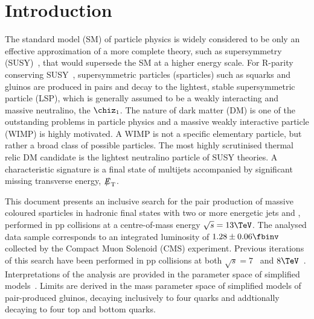 \section{Introduction}
\label{sec:introduction}

The standard model (SM) of particle physics is widely considered to be
only an effective approximation of a more complete theory, such as
supersymmetry (SUSY)~\cite{ref:SUSY-1,ref:SUSY0,ref:SUSY1,ref:SUSY2,ref:SUSY3,ref:SUSY4,ref:hierarchy1,ref:hierarchy2},
that would supersede the SM at a higher energy scale. For R-parity conserving
SUSY~\cite{Farrar:1978xj}, supersymmetric particles (sparticles) such
as squarks and gluinos are produced in pairs and decay to the
lightest, stable supersymmetric particle (LSP), which is generally
assumed to be a weakly interacting and massive neutralino, the $\chiz_1$. 
The nature of dark matter (DM) is one of the outstanding problems in particle physics and a massive weakly interactive particle (WIMP) is highly motivated. A WIMP is not a specific elementary particle, but rather a broad class of possible particles. The most highly scrutinised thermal relic DM candidate is the lightest neutralino particle of SUSY theories.
A characteristic signature is a final state of multijets accompanied by
significant missing transverse energy, $\met$.

This document presents an inclusive search for the pair production of
massive coloured sparticles in hadronic final states with two or more
energetic jets and \met, performed in pp collisions at a
centre-of-mass energy $\sqrt{s} = 13\TeV$. The analysed data sample
corresponds to an integrated luminosity of $1.28 \pm 0.06 \fbinv$~\cite{lumi} collected by the Compact Muon Solenoid (CMS)
experiment. Previous iterations of this search have been performed in
pp collisions at both $\sqrt{s} = 7$~\cite{RA1Paper, RA1Paper2011,
  RA1Paper2011FULL} and $8\TeV$~\cite{RA1Paper2012}.
%
%
Interpretations of the analysis are provided in the parameter space of simplified models~\cite{Alwall:2008ag, Alwall:2008va, sms}. Limits are derived in the mass parameter space of simplified models of pair-produced gluinos, decaying inclusively to four quarks and addtionally decaying to four top and bottom quarks.

